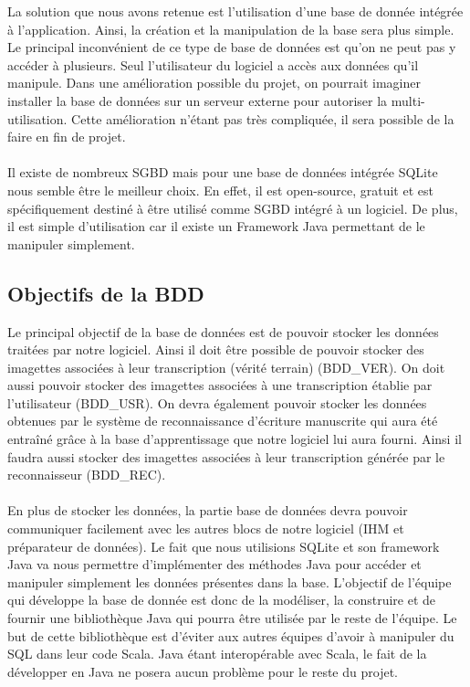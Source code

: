 La solution que nous avons retenue est l’utilisation d’une base de donnée intégrée à l’application. Ainsi, la création et la manipulation de la base sera plus simple. Le principal inconvénient de ce type de base de données est qu’on ne peut pas y accéder à plusieurs. Seul l’utilisateur du logiciel a accès aux données qu’il manipule.
Dans une amélioration possible du projet, on pourrait imaginer installer la base de données sur un serveur externe pour autoriser la multi-utilisation. Cette amélioration n’étant pas très compliquée, il sera possible de la faire en fin de projet.

\paragraph{}

Il existe de nombreux SGBD mais pour une base de données intégrée SQLite nous semble être le meilleur choix. En effet, il est open-source, gratuit et est spécifiquement destiné à être utilisé comme SGBD intégré à un logiciel. De plus, il est simple d’utilisation car il existe un Framework Java permettant de le manipuler simplement.

\subsection{Objectifs de la BDD}

Le principal objectif de la base de données est de pouvoir stocker les données traitées par notre logiciel. Ainsi il doit être possible de pouvoir stocker des imagettes associées à leur transcription (vérité terrain) (BDD_VER). On doit aussi pouvoir stocker des imagettes associées à une transcription établie par l'utilisateur (BDD_USR). On devra également pouvoir stocker les données obtenues par le système de reconnaissance d’écriture manuscrite qui aura été entraîné grâce à la base d’apprentissage que notre logiciel lui aura fourni. Ainsi il faudra aussi stocker des imagettes associées à leur transcription générée par le reconnaisseur (BDD_REC). 

\paragraph{}

En plus de stocker les données, la partie base de données devra pouvoir communiquer facilement avec les autres blocs de notre logiciel (IHM et préparateur de données). Le fait que nous utilisions SQLite et son framework Java va nous permettre d’implémenter des méthodes Java pour accéder et manipuler simplement les données présentes dans la base. L’objectif de l’équipe qui développe la base de donnée est donc de la modéliser, la construire et de fournir une bibliothèque Java qui pourra être utilisée par le reste de l’équipe. Le but de cette bibliothèque est d’éviter aux autres équipes d’avoir à manipuler du SQL dans leur code Scala. Java étant interopérable avec Scala, le fait de la développer en Java ne posera aucun problème pour le reste du projet.

